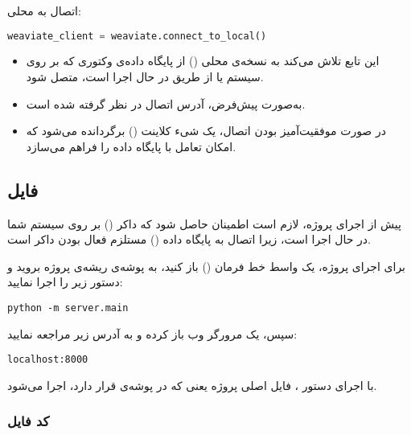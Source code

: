 \documentclass{article}
\begin{document}
اتصال به  محلی:

\begin{latin}
\begin{lstlisting}[language=Python]
weaviate_client = weaviate.connect_to_local()
\end{lstlisting}
\end{latin}

\begin{itemize}
    \item این تابع تلاش می‌کند به نسخه‌ی محلی () از پایگاه داده‌ی وکتوری  که بر روی سیستم یا از طریق  در حال اجرا است، متصل شود.
    \item به‌صورت پیش‌فرض، آدرس اتصال  در نظر گرفته شده است.
    \item در صورت موفقیت‌آمیز بودن اتصال، یک شیء کلاینت () برگردانده می‌شود که امکان تعامل با پایگاه داده را فراهم می‌سازد. 
\end{itemize}


\subsection{فایل }

پیش از اجرای پروژه، لازم است اطمینان حاصل شود که داکر () بر روی سیستم شما در حال اجرا است، زیرا اتصال به پایگاه داده () مستلزم فعال بودن داکر است.

برای اجرای پروژه، یک واسط خط فرمان () باز کنید، به پوشه‌ی ریشه‌ی پروژه بروید و دستور زیر را اجرا نمایید:

\begin{latin}
\begin{lstlisting}
python -m server.main
\end{lstlisting}
\end{latin}

سپس، یک مرورگر وب باز کرده و به آدرس زیر مراجعه نمایید:

\begin{latin}
\begin{lstlisting}
localhost:8000
\end{lstlisting}
\end{latin}

با اجرای دستور ، فایل اصلی پروژه یعنی  که در پوشه‌ی  قرار دارد، اجرا می‌شود.

\subsubsection{کد فایل }
\end{document}
